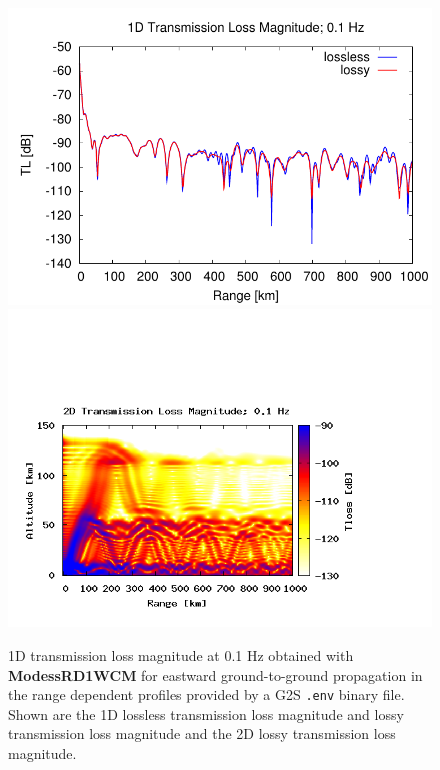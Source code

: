 \begin{figure}[h]
\begin{center}
\includegraphics[scale=0.60]{figs/rdmodess_ex2_1d}
\includegraphics[scale=0.45,trim = 20 20 110 140,clip]{figs/rdmodess_ex2_2d.png}
\end{center}
\caption{1D transmission loss magnitude at 0.1 Hz obtained with {\bf ModessRD1WCM} for eastward ground-to-ground propagation in the range dependent profiles provided by a G2S {\tt .env} binary file. Shown are the 1D lossless transmission loss magnitude and lossy transmission loss magnitude and the 2D lossy transmission loss magnitude.}
\label{fig: rdmodess ex2}
\end{figure}